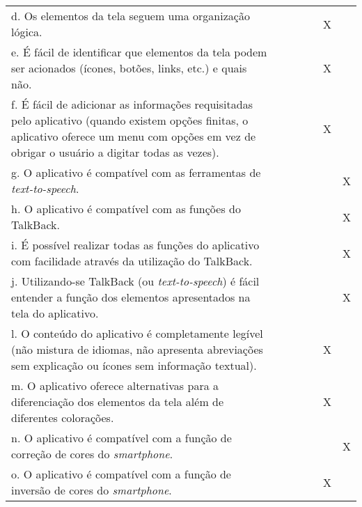 \documentclass[portuguese,oneside]{tcc}
\begin{document}
\begin{table}[h]
{\begin{tabu}{|L{25em}|c|c|c|c|c|c|}
							d. Os elementos da tela seguem uma organização lógica. & & & & & X & \\ 
							e. É fácil de identificar que elementos da tela podem ser acionados (ícones, botões, links, etc.) e quais não. & & & & & X & \\ 
							f. É fácil de adicionar as informações requisitadas pelo aplicativo (quando existem opções finitas, o aplicativo oferece um menu com opções em vez de obrigar o usuário a digitar todas as vezes). & & & & & X & \\ 
							g. O aplicativo é compatível com as ferramentas de \emph{text-to-speech}. & & & & & & X \\ 
							h. O aplicativo é compatível com as funções do TalkBack. & & & & & & X \\ 
							i. É possível realizar todas as funções do aplicativo com facilidade através da utilização do TalkBack.	& & & & & & X \\ 
							j. Utilizando-se TalkBack (ou \emph{text-to-speech}) é fácil entender a função dos elementos apresentados na tela do aplicativo. & & & & & & X \\ 
							l. O conteúdo do aplicativo é completamente legível (não mistura de idiomas, não apresenta abreviações sem explicação ou ícones sem informação textual). & & & & & X & \\ 
							m. O aplicativo oferece alternativas para a diferenciação dos elementos da tela além de diferentes colorações. & & & & & X & \\ 
							n. O aplicativo é compatível com a função de correção de cores do \emph{smartphone}. & & & & & & X \\ 
							o. O aplicativo é compatível com a função de inversão de cores do \emph{smartphone}. & & & & & X & \\ 
						\end{tabu}}
					\end{table}
					
\end{document}
